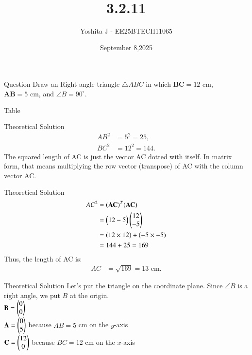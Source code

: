 \documentclass{beamer}
\begin{document}
\title 
{3.2.11}
\date{September 8,2025}


\author 
{Yoshita J - EE25BTECH11065}






\frame{\titlepage}
\begin{frame}{Question}
 Draw an Right angle  triangle $\triangle ABC$ in which $\boldsymbol{BC} = 12 \text{ cm}$, $\boldsymbol{AB} = 5 \text{ cm}$, and $\angle B = 90^\circ$.

\end{frame}



\begin{frame}{Table}
    \begin{table}[h!]    
      \centering
      
      \caption{}
    \end{table}
\end{frame}
\begin{frame}{Theoretical Solution}
\begin{align}
      AB^2 & = 5^2 = 25, \\
      BC^2 & = 12^2 = 144.
   \end{align}
  The squared length of AC is just the vector AC dotted with itself. In matrix form, that means multiplying the row vector (transpose) of AC with the column vector AC.
\end{frame}

\begin{frame}{Theoretical Solution}
\begin{align}
    AC^2 &= (\mathbf{AC})^T (\mathbf{AC}) \\
         &= \begin{pmatrix}12 -5\end{pmatrix} \begin{pmatrix}12 \\ -5\end{pmatrix} \\
         &= (12 \times 12) + (-5 \times -5) \\
         &= 144 + 25 = 169
\end{align}
Thus, the length of AC is:
\begin{align}
    AC &= \sqrt{169} = 13 \text{ cm}.
\end{align}

\end{frame}
\begin{frame}{Theoretical Solution}
Let's put the triangle on the coordinate plane.  
Since $\angle B$ is a right angle, we put $B$ at the origin.  \\


      $\mathbf{B} = \begin{pmatrix}0\\0\end{pmatrix}$\\
      $\mathbf{A} = \begin{pmatrix}0\\5\end{pmatrix}$ because $AB = 5$ cm on the $y$-axis\\
      $\mathbf{C} = \begin{pmatrix}12\\0\end{pmatrix}$ because $BC = 12$ cm on the $x$-axis\\
\end{frame}
\end{document}
